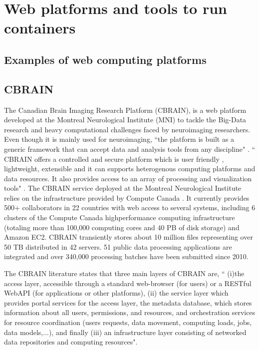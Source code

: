 \section{Web platforms and tools to run containers}
\subsection{Examples of web computing platforms}
\subsection{CBRAIN}
The Canadian Brain Imaging Research Platform (CBRAIN), is a web platform developed at the Montreal Neurological Institute (MNI) to tackle the Big-Data research and heavy computational challenges faced by neuroimaging researchers. Even though it is mainly used for neuroimaging, ``the platform is built as a generic framework that can accept data and analysis tools from any discipline" \cite{DBLP:journals/fini/DasGRSPMSRSKMKR17}. `` CBRAIN offers a controlled and secure platform which is user friendly , lightweight, extensible and it can supports heterogenous computing platforms and data resources. It also provides access to an array of processing and visualization tools" . The CBRAIN service deployed at the Montreal Neurological Institute relies on the infrastructure provided by Compute Canada \cite{DAS20161188}. It currently provides 500+ collaborators in 22 countries with web access to several systems, including 6 clusters of the Compute Canada highperformance computing infrastructure (totaling more than 100,000 computing cores and 40 PB of disk storage) and Amazon EC2. CBRAIN transiently stores about 10 million files representing over 50 TB distributed in 42 servers. 51 public data processing applications are integrated and over 340,000 processing batches have been submitted since 2010.

The CBRAIN literature \cite{DBLP:journals/fini/DasGRSPMSRSKMKR17} states that three main layers of CBRAIN are, `` (i)the access layer, accessible through a standard web-browser (for users) or a RESTful WebAPI (for applications or other platforms), (ii) the service layer which provides portal services for the access layer, the metadata database, which stores information about all users, permissions, and resources, and orchestration services for resource coordination (users requests, data movement, computing loads, jobs, data models,...), and finally (iii) an infrastructure layer consisting of networked data repositories and computing resources".

